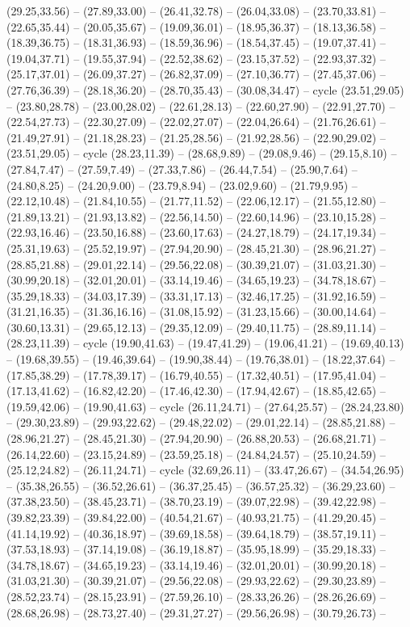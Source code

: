 {(29.25,33.56) -- (27.89,33.00) -- (26.41,32.78) -- (26.04,33.08) -- (23.70,33.81) -- (22.65,35.44) -- (20.05,35.67) -- (19.09,36.01) -- (18.95,36.37) -- (18.13,36.58) -- (18.39,36.75) -- (18.31,36.93) -- (18.59,36.96) -- (18.54,37.45) -- (19.07,37.41) -- (19.04,37.71) -- (19.55,37.94) -- (22.52,38.62) -- (23.15,37.52) -- (22.93,37.32) -- (25.17,37.01) -- (26.09,37.27) -- (26.82,37.09) -- (27.10,36.77) -- (27.45,37.06) -- (27.76,36.39) -- (28.18,36.20) -- (28.70,35.43) -- (30.08,34.47) -- cycle (23.51,29.05) -- (23.80,28.78) -- (23.00,28.02) -- (22.61,28.13) -- (22.60,27.90) -- (22.91,27.70) -- (22.54,27.73) -- (22.30,27.09) -- (22.02,27.07) -- (22.04,26.64) -- (21.76,26.61) -- (21.49,27.91) -- (21.18,28.23) -- (21.25,28.56) -- (21.92,28.56) -- (22.90,29.02) -- (23.51,29.05) -- cycle (28.23,11.39) -- (28.68,9.89) -- (29.08,9.46) -- (29.15,8.10) -- (27.84,7.47) -- (27.59,7.49) -- (27.33,7.86) -- (26.44,7.54) -- (25.90,7.64) -- (24.80,8.25) -- (24.20,9.00) -- (23.79,8.94) -- (23.02,9.60) -- (21.79,9.95) -- (22.12,10.48) -- (21.84,10.55) -- (21.77,11.52) -- (22.06,12.17) -- (21.55,12.80) -- (21.89,13.21) -- (21.93,13.82) -- (22.56,14.50) -- (22.60,14.96) -- (23.10,15.28) -- (22.93,16.46) -- (23.50,16.88) -- (23.60,17.63) -- (24.27,18.79) -- (24.17,19.34) -- (25.31,19.63) -- (25.52,19.97) -- (27.94,20.90) -- (28.45,21.30) -- (28.96,21.27) -- (28.85,21.88) -- (29.01,22.14) -- (29.56,22.08) -- (30.39,21.07) -- (31.03,21.30) -- (30.99,20.18) -- (32.01,20.01) -- (33.14,19.46) -- (34.65,19.23) -- (34.78,18.67) -- (35.29,18.33) -- (34.03,17.39) -- (33.31,17.13) -- (32.46,17.25) -- (31.92,16.59) -- (31.21,16.35) -- (31.36,16.16) -- (31.08,15.92) -- (31.23,15.66) -- (30.00,14.64) -- (30.60,13.31) -- (29.65,12.13) -- (29.35,12.09) -- (29.40,11.75) -- (28.89,11.14) -- (28.23,11.39) -- cycle (19.90,41.63) -- (19.47,41.29) -- (19.06,41.21) -- (19.69,40.13) -- (19.68,39.55) -- (19.46,39.64) -- (19.90,38.44) -- (19.76,38.01) -- (18.22,37.64) -- (17.85,38.29) -- (17.78,39.17) -- (16.79,40.55) -- (17.32,40.51) -- (17.95,41.04) -- (17.13,41.62) -- (16.82,42.20) -- (17.46,42.30) -- (17.94,42.67) -- (18.85,42.65) -- (19.59,42.06) -- (19.90,41.63) -- cycle (26.11,24.71) -- (27.64,25.57) -- (28.24,23.80) -- (29.30,23.89) -- (29.93,22.62) -- (29.48,22.02) -- (29.01,22.14) -- (28.85,21.88) -- (28.96,21.27) -- (28.45,21.30) -- (27.94,20.90) -- (26.88,20.53) -- (26.68,21.71) -- (26.14,22.60) -- (23.15,24.89) -- (23.59,25.18) -- (24.84,24.57) -- (25.10,24.59) -- (25.12,24.82) -- (26.11,24.71) -- cycle (32.69,26.11) -- (33.47,26.67) -- (34.54,26.95) -- (35.38,26.55) -- (36.52,26.61) -- (36.37,25.45) -- (36.57,25.32) -- (36.29,23.60) -- (37.38,23.50) -- (38.45,23.71) -- (38.70,23.19) -- (39.07,22.98) -- (39.42,22.98) -- (39.82,23.39) -- (39.84,22.00) -- (40.54,21.67) -- (40.93,21.75) -- (41.29,20.45) -- (41.14,19.92) -- (40.36,18.97) -- (39.69,18.58) -- (39.64,18.79) -- (38.57,19.11) -- (37.53,18.93) -- (37.14,19.08) -- (36.19,18.87) -- (35.95,18.99) -- (35.29,18.33) -- (34.78,18.67) -- (34.65,19.23) -- (33.14,19.46) -- (32.01,20.01) -- (30.99,20.18) -- (31.03,21.30) -- (30.39,21.07) -- (29.56,22.08) -- (29.93,22.62) -- (29.30,23.89) -- (28.52,23.74) -- (28.15,23.91) -- (27.59,26.10) -- (28.33,26.26) -- (28.26,26.69) -- (28.68,26.98) -- (28.73,27.40) -- (29.31,27.27) -- (29.56,26.98) -- (30.79,26.73) -- }
